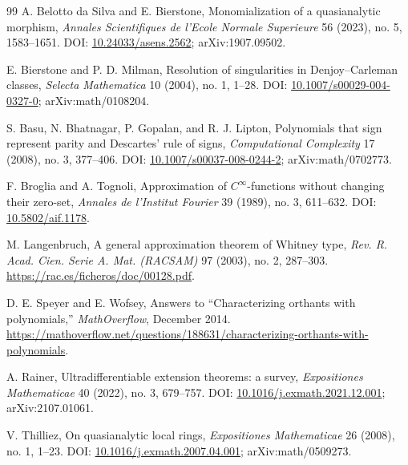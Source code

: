 \documentclass[11pt]{article}
\theoremstyle{definition}
\theoremstyle{remark}
\begin{document}
\begin{thebibliography}{99}
A. Belotto da Silva and E. Bierstone,
\newblock Monomialization of a quasianalytic morphism,
\newblock \emph{Annales Scientifiques de l'Ecole Normale Superieure} 56 (2023), no. 5, 1583--1651.
\newblock DOI: \href{https://doi.org/10.24033/asens.2562}{10.24033/asens.2562}; arXiv:1907.09502.

E. Bierstone and P. D. Milman,
\newblock Resolution of singularities in Denjoy--Carleman classes,
\newblock \emph{Selecta Mathematica} 10 (2004), no. 1, 1--28.
\newblock DOI: \href{https://doi.org/10.1007/s00029-004-0327-0}{10.1007/s00029-004-0327-0}; arXiv:math/0108204.


S. Basu, N. Bhatnagar, P. Gopalan, and R. J. Lipton,
\newblock Polynomials that sign represent parity and Descartes' rule of signs,
\newblock \emph{Computational Complexity} 17 (2008), no. 3, 377--406.
\newblock DOI: \href{https://doi.org/10.1007/s00037-008-0244-2}{10.1007/s00037-008-0244-2}; arXiv:math/0702773.

F. Broglia and A. Tognoli,
\newblock Approximation of $C^\infty$-functions without changing their zero-set,
\newblock \emph{Annales de l'Institut Fourier} 39 (1989), no. 3, 611--632.
\newblock DOI: \href{https://doi.org/10.5802/aif.1178}{10.5802/aif.1178}.

M. Langenbruch,
\newblock A general approximation theorem of Whitney type,
\newblock \emph{Rev. R. Acad. Cien. Serie A. Mat. (RACSAM)} 97 (2003), no. 2, 287--303.
\newblock \url{https://rac.es/ficheros/doc/00128.pdf}.

D. E. Speyer and E. Wofsey,
\newblock Answers to ``Characterizing orthants with polynomials,''
\newblock \emph{MathOverflow}, December 2014.
\newblock \url{https://mathoverflow.net/questions/188631/characterizing-orthants-with-polynomials}.

A. Rainer,
\newblock Ultradifferentiable extension theorems: a survey,
\newblock \emph{Expositiones Mathematicae} 40 (2022), no. 3, 679--757.
\newblock DOI: \href{https://doi.org/10.1016/j.exmath.2021.12.001}{10.1016/j.exmath.2021.12.001}; arXiv:2107.01061.

V. Thilliez,
\newblock On quasianalytic local rings,
\newblock \emph{Expositiones Mathematicae} 26 (2008), no. 1, 1--23.
\newblock DOI: \href{https://doi.org/10.1016/j.exmath.2007.04.001}{10.1016/j.exmath.2007.04.001}; arXiv:math/0509273.

\end{thebibliography}
\end{document}
